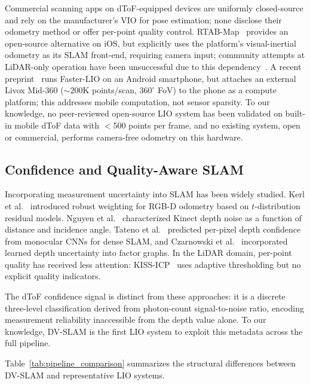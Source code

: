 \documentclass[journal]{IEEEtran}
\begin{document}
Commercial scanning apps on dToF-equipped devices are uniformly closed-source and rely on the manufacturer's VIO for pose estimation; none disclose their odometry method or offer per-point quality control. RTAB-Map~\cite{labbe2019rtabmap} provides an open-source alternative on iOS, but explicitly uses the platform's visual-inertial odometry as its SLAM front-end, requiring camera input; community attempts at LiDAR-only operation have been unsuccessful due to this dependency~\cite{rtabmap_issue1026}. A recent preprint~\cite{liu2025livoxphone} runs Faster-LIO on an Android smartphone, but attaches an external Livox Mid-360 (${\sim}$200K points/scan, $360^{\circ}$ FoV) to the phone as a compute platform; this addresses mobile computation, not sensor sparsity. To our knowledge, no peer-reviewed open-source LIO system has been validated on built-in mobile dToF data with $<$500 points per frame, and no existing system, open or commercial, performs camera-free odometry on this hardware.

\subsection{Confidence and Quality-Aware SLAM}

Incorporating measurement uncertainty into SLAM has been widely studied. Kerl et al.~\cite{kerl2013robust} introduced robust weighting for RGB-D odometry based on $t$-distribution residual models. Nguyen et al.~\cite{nguyen2012modeling} characterized Kinect depth noise as a function of distance and incidence angle. Tateno et al.~\cite{tateno2017cnnslam} predicted per-pixel depth confidence from monocular CNNs for dense SLAM, and Czarnowski et al.~\cite{czarnowski2020deepfactors} incorporated learned depth uncertainty into factor graphs. In the LiDAR domain, per-point quality has received less attention: KISS-ICP~\cite{vizzo2023kiss} uses adaptive thresholding but no explicit quality indicators.

The dToF confidence signal is distinct from these approaches: it is a discrete three-level classification derived from photon-count signal-to-noise ratio, encoding measurement reliability inaccessible from the depth value alone. To our knowledge, DV-SLAM is the first LIO system to exploit this metadata across the full pipeline.

Table~\ref{tab:pipeline_comparison} summarizes the structural differences between DV-SLAM and representative LIO systems.
\end{document}
